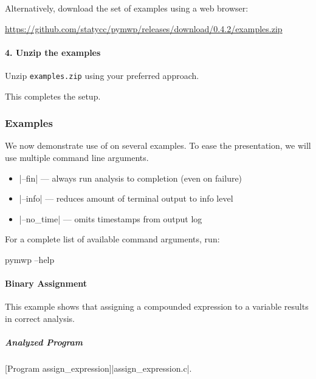 Alternatively, download the set of examples using a web browser:

\url{https://github.com/statycc/pymwp/releases/download/0.4.2/examples.zip}

\paragraph*{4. Unzip the examples}
Unzip \texttt{examples.zip} using your preferred approach.

This completes the setup.

\subsubsection{Examples}\label{guide-examples}

We now demonstrate use of  on several examples. To ease the
presentation, we will use multiple command line arguments.

\begin{itemize}
\item \pr|--fin| --- always run analysis to completion (even on failure)
\item \pr|--info| --- reduces amount of terminal output to info level
\item \pr|--no_time| --- omits timestamps from output log
\end{itemize}

For a complete list of available command arguments, run:

\begin{center}
\begin{minipage}{\textwidth}
\begin{cmdlisting}[label={lst:help-cmd}]
pymwp --help
\end{cmdlisting}
\end{minipage}
\end{center}

\paragraph{Binary Assignment}\label{binary-assignment}
This example shows that assigning a compounded expression to a variable results
in correct analysis.

\subparagraph*{Analyzed Program}

\begin{center}
\begin{minipage}{\textwidth}
\captionsetup{type=lstlisting}
[Program assign\_expression]{\pr|assign\_expression.c|.}
\label{lst:assgn_exp}
\end{minipage}
\end{center}

